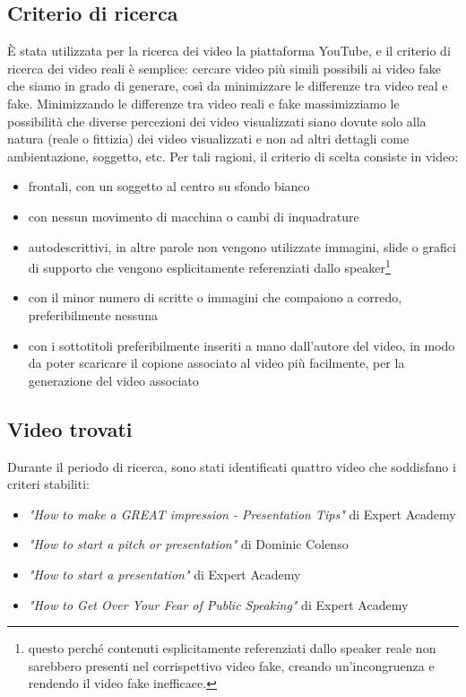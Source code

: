 \subsection{Criterio di ricerca}
È stata utilizzata per la ricerca dei video la piattaforma YouTube, e il criterio di ricerca dei video reali è semplice: cercare video più simili possibili ai video fake che siamo in grado di generare, così da minimizzare le differenze tra video real e fake. Minimizzando le differenze tra video reali e fake massimizziamo le possibilità che diverse percezioni dei video visualizzati siano dovute solo alla natura (reale o fittizia) dei video visualizzati e non ad altri dettagli come ambientazione, soggetto, etc. Per tali ragioni, il criterio di scelta consiste in video:
\begin{itemize}
    \item frontali, con un soggetto al centro su sfondo bianco
    \item con nessun movimento di macchina o cambi di inquadrature
    \item autodescrittivi, in altre parole non vengono utilizzate immagini, slide o grafici di supporto che vengono esplicitamente referenziati dallo speaker\footnote{questo perché contenuti esplicitamente referenziati dallo speaker reale non sarebbero presenti nel corrispettivo video fake, creando un'incongruenza e rendendo il video fake inefficace.}
    \item con il minor numero di scritte o immagini che compaiono a corredo, preferibilmente nessuna
    \item con i sottotitoli preferibilmente inseriti a mano dall'autore del video, in modo da poter scaricare il copione associato al video più facilmente, per la generazione del video associato
\end{itemize}

\subsection{Video trovati}

Durante il periodo di ricerca, sono stati identificati quattro video che soddisfano i criteri stabiliti:
\begin{itemize}
    \item \textit{"How to make a GREAT impression - Presentation Tips"} di Expert Academy %
    \item \textit{"How to start a pitch or presentation"} di Dominic Colenso %
    \item \textit{"How to start a presentation"} di Expert Academy %
    \item \textit{"How to Get Over Your Fear of Public Speaking"} di Expert Academy %
\end{itemize}

